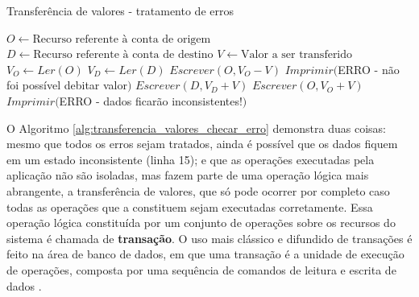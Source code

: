 \documentclass[11pt,twoside,a4paper]{book}
\begin{document}
\begin{algorithm}
\caption{Transferência de valores - tratamento de erros}
\label{alg:transferencia_valores_checar_erro}
\begin{algorithmic}[1]
\State $O \gets \text{Recurso referente à conta de origem}$
\State $D \gets \text{Recurso referente à conta de destino}$
\State $V \gets \text{Valor a ser transferido}$
\State $V_O \gets Ler(O)$
    \State $V_D \gets Ler(D)$
    \State $Escrever(O, V_O - V)$
        \State $Imprimir($ERRO - não foi possível debitar valor$)$
    \Else
        \State $Escrever(D, V_D + V)$
            \State $Escrever(O, V_O + V)$
                \State $Imprimir($ERRO - dados ficarão inconsistentes!$)$
            \EndIf
        \EndIf
    \EndIf
\EndIf
\end{algorithmic}
\end{algorithm}

O Algoritmo \ref{alg:transferencia_valores_checar_erro} demonstra duas coisas: mesmo que todos os erros sejam tratados, ainda é possível que os dados fiquem em um estado inconsistente (linha 15); e que as operações executadas pela aplicação não são isoladas, mas fazem parte de uma operação lógica mais abrangente, a transferência de valores, que só pode ocorrer por completo caso todas as operações que a constituem sejam executadas corretamente. Essa operação lógica constituída por um conjunto de operações sobre os recursos do sistema é chamada de \textbf{transação}. O uso mais clássico e difundido de transações é feito na área de banco de dados, em que uma transação é a unidade de execução de operações, composta por uma sequência de comandos de leitura e escrita de dados \cite{garcia-molina, vaca}.

\end{document}
